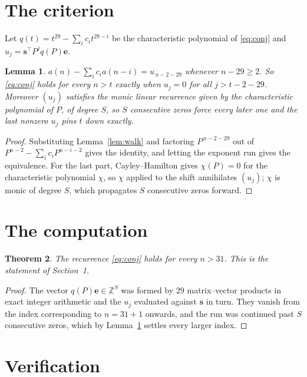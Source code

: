 \documentclass[11pt,a4paper]{article}
\theoremstyle{plain}
\newtheorem{theorem}{Theorem}
\newtheorem{lemma}[theorem]{Lemma}
\theoremstyle{definition}
\begin{document}
\section{The criterion}

Let $q(t)=t^{29}-\sum_i c_i t^{29-i}$ be the characteristic polynomial of
\eqref{eq:conj} and $u_j=\mathbf{s}^{\!\top}P^{j}q(P)\mathbf{e}$.

\begin{lemma}\label{lem:crit}
$a(n)-\sum_i c_i a(n-i)=u_{\,n-2-29}$ whenever $n-29\ge2$. So \eqref{eq:conj}
holds for every $n>t$ exactly when $u_j=0$ for all $j>t-2-29$. Moreover $(u_j)$
satisfies the monic linear recurrence given by the characteristic polynomial of $P$, of
degree $S$, so $S$ consecutive zeros force every later one and the last nonzero $u_j$ pins
$t$ down exactly.
\end{lemma}

\begin{proof}
Substituting Lemma~\ref{lem:walk} and factoring $P^{\,n-2-29}$ out of
$P^{n-2}-\sum_i c_i P^{n-i-2}$ gives the identity, and letting the exponent run gives the
equivalence. For the last part, Cayley--Hamilton gives $\chi(P)=0$ for the characteristic
polynomial $\chi$, so $\chi$ applied to the shift annihilates $(u_j)$; $\chi$ is monic of
degree $S$, which propagates $S$ consecutive zeros forward.
\end{proof}

\section{The computation}

\begin{theorem}
The recurrence \eqref{eq:conj} holds for every $n>31$. This is the statement of
Section~1.
\end{theorem}

\begin{proof}
The vector $q(P)\mathbf{e}\in\mathbb{Z}^{S}$ was formed by $29$ matrix--vector
products in exact integer arithmetic and the $u_j$ evaluated against $\mathbf{s}$ in turn.
They vanish from the index corresponding to $n=31+1$ onwards, and the run was continued
past $S$ consecutive zeros, which by Lemma~\ref{lem:crit} settles every larger index.
\end{proof}

\section{Verification}
\end{document}
